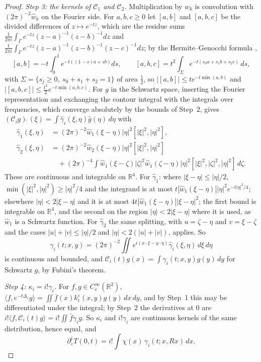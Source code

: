 \documentclass[pdflatex,sn-mathphys-num]{sn-jnl}
\theoremstyle{thmstyleone}%
\theoremstyle{thmstylethree}%
\newcommand{\R}{\mathbb{R}}
\begin{document}
\begin{appendices}
\begin{proof}
\emph{Step 3: the kernels of $\mathcal C_1$ and $\mathcal C_2$.} Multiplication by $w_k$ is convolution with $(2\pi)^{-2}\hat w_k$ on the Fourier side. For $a,b,c\ge0$ let $[a,b]$ and $[a,b,c]$ be the divided differences of $z\mapsto e^{-tz}$, which are the residue sums $\frac1{2\pi i}\int_\Gamma e^{-tz}(z-a)^{-1}(z-b)^{-1}dz$ and $\frac1{2\pi i}\int_\Gamma e^{-tz}(z-a)^{-1}(z-b)^{-1}(z-c)^{-1}dz$; by the Hermite--Genocchi formula \cite{deboor2005},
\[
[a,b]=-t\int_0^1e^{-t((1-s)a+sb)}ds,\qquad [a,b,c]=t^2\int_{\Sigma}e^{-t(s_0a+s_1b+s_2c)}\,ds,
\]
with $\Sigma=\{s_j\ge0,\ s_0+s_1+s_2=1\}$ of area $\frac12$, so $|[a,b]|\le te^{-t\min(a,b)}$ and $|[a,b,c]|\le\frac{t^2}2e^{-t\min(a,b,c)}$. For $g$ in the Schwartz space, inserting the Fourier representation and exchanging the contour integral with the integrals over frequencies, which converge absolutely by the bounds of Step~2, gives $(\mathcal C_ig)\hat{\ }(\xi)=\int\hat\gamma_i(\xi,\eta)\hat g(\eta)\,d\eta$ with
\[
\begin{aligned}
\hat\gamma_1(\xi,\eta)&=(2\pi)^{-2}\hat w_1(\xi-\eta)|\eta|^2[|\xi|^2,|\eta|^2],\\
\hat\gamma_2(\xi,\eta)&=(2\pi)^{-2}\hat w_2(\xi-\eta)|\eta|^2[|\xi|^2,|\eta|^2]\\
&\quad+(2\pi)^{-4}\!\int\hat w_1(\xi-\zeta)|\zeta|^2\hat w_1(\zeta-\eta)|\eta|^2[|\xi|^2,|\zeta|^2,|\eta|^2]\,d\zeta .
\end{aligned}
\]
These are continuous and integrable on $\R^4$. For $\hat\gamma_1$: where $|\xi-\eta|\le|\eta|/2$, $\min(|\xi|^2,|\eta|^2)\ge|\eta|^2/4$ and the integrand is at most $t|\hat w_1(\xi-\eta)||\eta|^2e^{-t|\eta|^2/4}$; elsewhere $|\eta|<2|\xi-\eta|$ and it is at most $4t|\hat w_1(\xi-\eta)||\xi-\eta|^2$; the first bound is integrable on $\R^4$, and the second on the region $|\eta|<2|\xi-\eta|$ where it is used, as $\hat w_1$ is a Schwartz function. For $\hat\gamma_2$ the same splitting, with $u=\zeta-\eta$ and $v=\xi-\zeta$ and the cases $|u|+|v|\le|\eta|/2$ and $|\eta|<2(|u|+|v|)$, applies. So
\[
\gamma_i(t;x,y)=(2\pi)^{-2}\iint e^{i(x\cdot\xi-y\cdot\eta)}\hat\gamma_i(\xi,\eta)\,d\xi\,d\eta
\]
is continuous and bounded, and $\mathcal C_i(t)g(x)=\int\gamma_i(t;x,y)g(y)\,dy$ for Schwartz $g$, by Fubini's theorem.

\emph{Step 4: $\kappa_i=i!\gamma_i$.} For $f,g\in C_c^\infty(\R^2)$, $\langle f,e^{-t\Delta_\varepsilon}g\rangle=\iint\bar f(x)k^\varepsilon_t(x,y)g(y)\,dx\,dy$, and by Step~1 this may be differentiated under the integral; by Step~2 the derivatives at $0$ are $i!\langle f,\mathcal C_i(t)g\rangle=i!\iint\bar f\gamma_ig$. So $\kappa_i$ and $i!\gamma_i$ are continuous kernels of the same distribution, hence equal, and
\[
\partial_\varepsilon^iT(0,t)=i!\int\chi(x)\,\gamma_i(t;x,Rx)\,dx .
\]


\end{proof}
\end{appendices}
\end{document}
